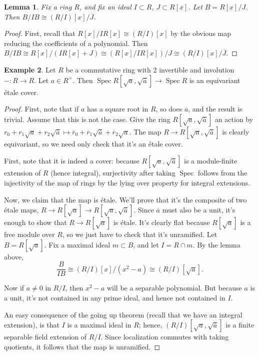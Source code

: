 \documentclass[edeposit,fullpage]{uiucthesis2009}
\DeclareMathOperator{\Spec}{Spec}
\theoremstyle{plain}
\newtheorem{lemma}{Lemma}
\numberwithin{lemma}{section}
\theoremstyle{definition}
\newtheorem{example}[lemma]{Example}
\begin{document}
\begin{lemma}
Fix a ring $R$, and fix an ideal $I \subset R$, $J \subset R[x]$. Let
$B = R[x]/J$. Then $B/IB \cong (R/I)[x]/\overline J$.
\end{lemma}

\begin{proof}
First, recall that $R[x]/IR[x] \cong (R/I)[x]$ by the obvious map
reducing the coefficients of a polynomial. Then $B/IB \cong
R[x]/(IR[x]+J) \cong (R[x]/IR[x])/J \cong (R/I)[x]/\overline J$.
\end{proof}

\begin{example}
Let $R$ be a commutative ring with 2 invertible and involution $- : R
\rightarrow R$. Let $a \in R^\times$. Then $\Spec
R[\sqrt{a},\sqrt{\overline a}] \rightarrow \Spec R$ is an equivariant \'etale cover. 
\end{example}

\begin{proof}
First, note that if $a$ has a square root in $R$, so does $\overline
a$, and the result is trivial. Assume that this is not the case. Give
the ring $R[\sqrt{a},\sqrt{\overline a}]$ an action by $r_0 +
r_1\sqrt{a} + r_2\sqrt{\overline a} \mapsto \overline r_0 + \overline
r_1\sqrt{\overline a} + \overline r_2 \sqrt{a}$. The map $R
\rightarrow R[\sqrt{a},\sqrt{\overline a}]$ is clearly equivariant, so
we need only check that it's an \'etale cover.

First, note that it is indeed a cover: because
$R[\sqrt{a},\sqrt{\overline a}]$ is a module-finite extension of $R$
(hence integral),
surjectivity after taking $\Spec$ follows from the injectivity of the
map of rings by the lying over property for integral extensions. 

Now, we claim that the map is \'etale. We'll prove that it's the
composite of two \'etale maps, $R \rightarrow R[\sqrt{a}] \rightarrow
R[\sqrt{a},\sqrt{\overline a}]$. Since $\overline a$ must also be a
unit, it's enough to show that $R \rightarrow R[\sqrt{a}]$ is \'etale. It's clearly flat because
$R[\sqrt{a}]$ is a free module over $R$, so we just
have to check that it's unramified. Let $B =
R[\sqrt{a}]$. Fix a maximal ideal $m \subset
B$, and let $I = R \cap m$. By the lemma above,
\[
\frac{B}{IB} \cong (R/I)[x]/(x^2 - a) \cong (R/I)[\sqrt{a}].
\]

Now if $a \neq 0$ in $R/I$, then $x^2-a$ will be a separable polynomial. But because $a$ is a unit, it's not contained in any prime
ideal, and hence not contained in $I$.

An easy consequence of the going up theorem (recall that we have
an integral extension), is that $I$ is a maximal ideal in $R$; hence,
$(R/I)[\sqrt{a},\sqrt{\overline a}]$ is a finite separable field
extension of $R/I$. Since localization commutes with taking quotients,
it follows that the map is unramified. 
\end{proof}
\end{document}
